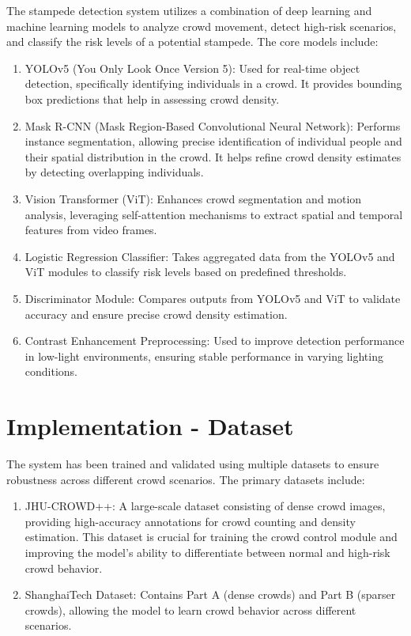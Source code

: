 \documentclass[11pt]{report}
\begin{document}
The stampede detection system utilizes a combination of deep learning and machine learning models to analyze crowd movement, detect high-risk scenarios, and classify the risk levels of a potential stampede. The core models include:
\begin{enumerate}
    \item YOLOv5 (You Only Look Once Version 5): Used for real-time object detection, specifically identifying individuals in a crowd. It provides bounding box predictions that help in assessing crowd density.
    \item Mask R-CNN (Mask Region-Based Convolutional Neural Network): Performs instance segmentation, allowing precise identification of individual people and their spatial distribution in the crowd. It helps refine crowd density estimates by detecting overlapping individuals.
    \item Vision Transformer (ViT): Enhances crowd segmentation and motion analysis, leveraging self-attention mechanisms to extract spatial and temporal features from video frames.
    \item Logistic Regression Classifier: Takes aggregated data from the YOLOv5 and ViT modules to classify risk levels based on predefined thresholds.
    \item Discriminator Module: Compares outputs from YOLOv5 and ViT to validate accuracy and ensure precise crowd density estimation.
    \item Contrast Enhancement Preprocessing: Used to improve detection performance in low-light environments, ensuring stable performance in varying lighting conditions.
\end{enumerate}

\section {Implementation - Dataset}

The system has been trained and validated using multiple datasets to ensure robustness across different crowd scenarios. The primary datasets include:
\begin{enumerate}
    \item JHU-CROWD++: A large-scale dataset consisting of dense crowd images, providing high-accuracy annotations for crowd counting and density estimation. This dataset is crucial for training the crowd control module and improving the model’s ability to differentiate between normal and high-risk crowd behavior.
    \item ShanghaiTech Dataset: Contains Part A (dense crowds) and Part B (sparser crowds), allowing the model to learn crowd behavior across different scenarios.
\end{enumerate}
\end{document}
